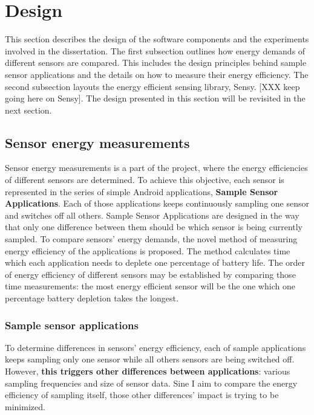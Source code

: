 \section{Design}
\label{s:design}
\hspace{10pt} This section describes the design of the software components and the experiments involved in the dissertation. The first subsection outlines how energy demands of different sensors are compared. This includes the design principles behind sample sensor applications and the details on how to measure their energy efficiency. The second subsection layouts the energy efficient sensing library, Sensy. [XXX keep going here on Sensy]. The design presented in this section will be revisited in the next section.

\subsection{Sensor energy measurements}
\label{s:design:measurements}
\hspace{10pt} Sensor energy measurements is a part of the project, where the energy efficiencies of different sensors are determined. To achieve this objective, each sensor is represented in the series of simple Android applications, \textbf{Sample Sensor Applications}. Each of those applications keeps continuously sampling one sensor and switches off all others. Sample Sensor Applications are designed in the way that only one difference between them should be which sensor is being currently sampled. To compare sensors' energy demands, the novel method of measuring energy efficiency of the applications is proposed. The method calculates time which each application needs to deplete one percentage of battery life. The order of energy efficiency of different sensors may be established by comparing those time measurements: the most energy efficient sensor will be the one which one percentage battery depletion takes the longest. 

\subsubsection{Sample sensor applications}
\label{s:design:measurements:sampleapps}
\hspace{10pt} To determine differences in sensors' energy efficiency, each of sample applications keeps sampling only one sensor while all others sensors are being switched off.  However, \textbf{this triggers other differences between applications}: various sampling frequencies and size of sensor data. Sine I aim to compare the energy efficiency of sampling itself, those other differences' impact is trying to be minimized. 

